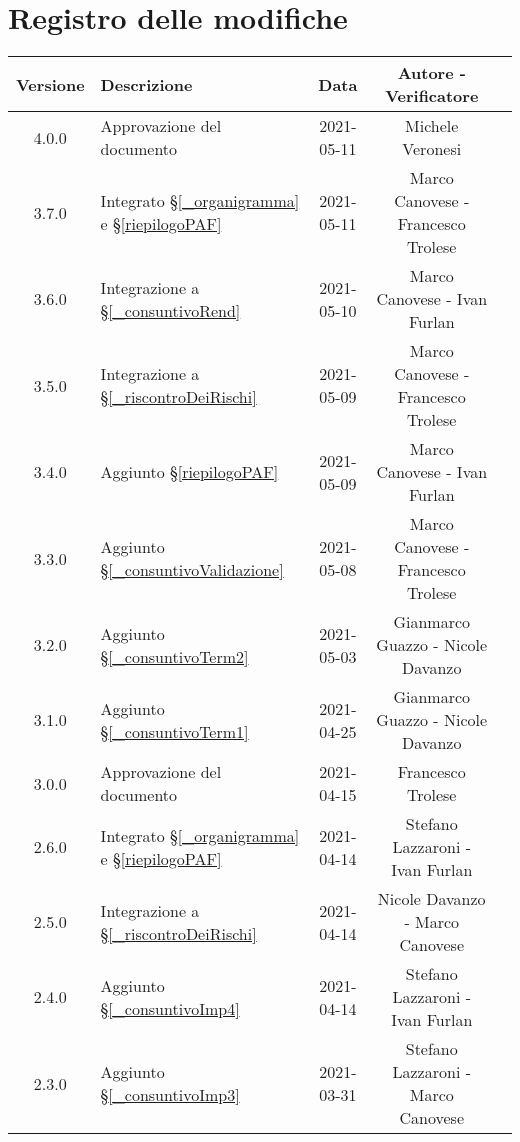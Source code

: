\section*{Registro delle modifiche}

\begin{center}
	\begin{longtable}{|c|p{5cm}|c|c|c|}
		\hline
		\rowcolor{lighter-grayer}
		\textbf{Versione} & \textbf{Descrizione} & \textbf{Data} & \textbf{Autore - Verificatore} \\
		\hline
		\endfirsthead


		\hline
		4.0.0 & Approvazione del documento & 2021-05-11 & Michele Veronesi \\
		3.7.0 & Integrato \S\ref{_organigramma} e \S\ref{riepilogoPAF} & 2021-05-11 & Marco Canovese - Francesco Trolese\\
		3.6.0 & Integrazione a \S\ref{_consuntivoRend} & 2021-05-10 & Marco Canovese - Ivan Furlan \\
		3.5.0 & Integrazione a \S\ref{_riscontroDeiRischi} & 2021-05-09 & Marco Canovese - Francesco Trolese \\
		3.4.0 & Aggiunto \S\ref{riepilogoPAF} & 2021-05-09 & Marco Canovese - Ivan Furlan\\
		3.3.0 & Aggiunto \S\ref{_consuntivoValidazione} & 2021-05-08 & Marco Canovese - Francesco Trolese\\
		3.2.0 & Aggiunto \S\ref{_consuntivoTerm2} & 2021-05-03 & Gianmarco Guazzo - Nicole Davanzo\\
		3.1.0 & Aggiunto \S\ref{_consuntivoTerm1} & 2021-04-25 & Gianmarco Guazzo - Nicole Davanzo \\
		3.0.0 & Approvazione del documento & 2021-04-15 & Francesco Trolese \\
		2.6.0 & Integrato \S\ref{_organigramma} e \S\ref{riepilogoPAF} & 2021-04-14 & Stefano Lazzaroni - Ivan Furlan\\
		2.5.0 & Integrazione a \S\ref{_riscontroDeiRischi} & 2021-04-14 & Nicole Davanzo - Marco Canovese \\
		2.4.0 & Aggiunto \S\ref{_consuntivoImp4} & 2021-04-14 & Stefano Lazzaroni - Ivan Furlan\\
		2.3.0 & Aggiunto \S\ref{_consuntivoImp3} & 2021-03-31 & Stefano Lazzaroni - Marco Canovese\\

\end{longtable}
\end{center}
